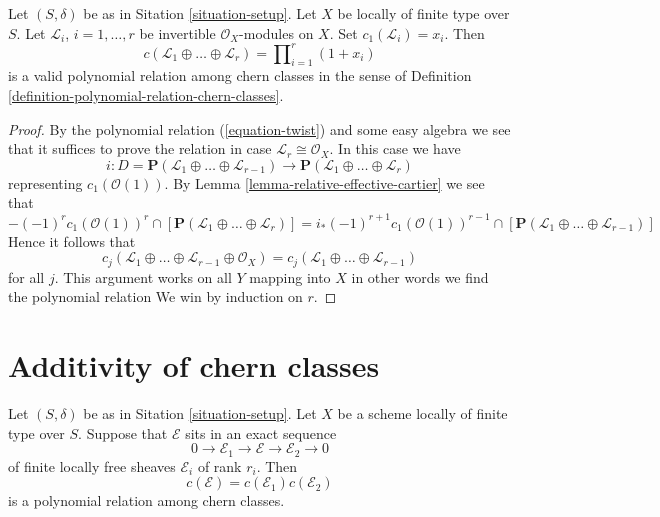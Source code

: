 \begin{lemma}
\label{lemma-chern-sum-linebundles}
Let $(S, \delta)$ be as in Sitation \ref{situation-setup}.
Let $X$ be locally of finite type over $S$.
Let ${\mathcal L}_i$, $i = 1, \ldots, r$ be invertible
$\mathcal{O}_X$-modules on $X$. Set
$c_1({\mathcal L}_i) = x_i$. Then
$$
c({\mathcal L}_1 \oplus \ldots \oplus {\mathcal L}_r)
=
\prod\nolimits_{i = 1}^r (1 + x_i) 
$$
is a valid polynomial relation among chern classes in the sense of
Definition \ref{definition-polynomial-relation-chern-classes}.
\end{lemma}

\begin{proof}
By the polynomial relation (\ref{equation-twist}) and some easy
algebra we see that it suffices to prove the relation in case
$\mathcal{L}_r \cong \mathcal{O}_X$. In this case we have
$$
i : D = \mathbf{P}({\mathcal L}_1 \oplus \ldots \oplus {\mathcal L}_{r - 1})
\to
\mathbf{P}({\mathcal L}_1 \oplus \ldots \oplus {\mathcal L}_r)
$$
representing $c_1(\mathcal{O}(1))$. By
Lemma \ref{lemma-relative-effective-cartier} we see that
$$
-(-1)^r c_1(\mathcal{O}(1))^r \cap
[\mathbf{P}({\mathcal L}_1 \oplus \ldots \oplus {\mathcal L}_r)]
=
i_* (-1)^{r + 1} c_1(\mathcal{O}(1))^{r - 1} \cap
[\mathbf{P}({\mathcal L}_1 \oplus \ldots \oplus {\mathcal L}_{r - 1})]
$$
Hence it follows that
$$
c_j({\mathcal L}_1 \oplus \ldots \oplus
\mathcal{L}_{r - 1} \oplus {\mathcal O}_X)
=
c_j({\mathcal L}_1 \oplus \ldots \oplus {\mathcal L}_{r - 1})
$$
for all $j$. This argument works on all $Y$ mapping into $X$ in other
words we find the polynomial relation
We win by induction on $r$.
\end{proof}


\section{Additivity of chern classes}
\label{section-additivity-chern-classes}

\begin{lemma}
\label{lemma-additivity-chern-classes}
Let $(S, \delta)$ be as in Sitation \ref{situation-setup}.
Let $X$ be a scheme locally of finite type over $S$.
Suppose that ${\mathcal E}$ sits in an
exact sequence
$$
0
\to
{\mathcal E}_1
\to 
{\mathcal E}
\to 
{\mathcal E}_2
\to 
0
$$
of finite locally free sheaves $\mathcal{E}_i$ of rank $r_i$.
Then
$$
c({\mathcal E}) = c({\mathcal E}_1) c({\mathcal E}_2)
$$
is a polynomial relation among chern classes.
\end{lemma}

